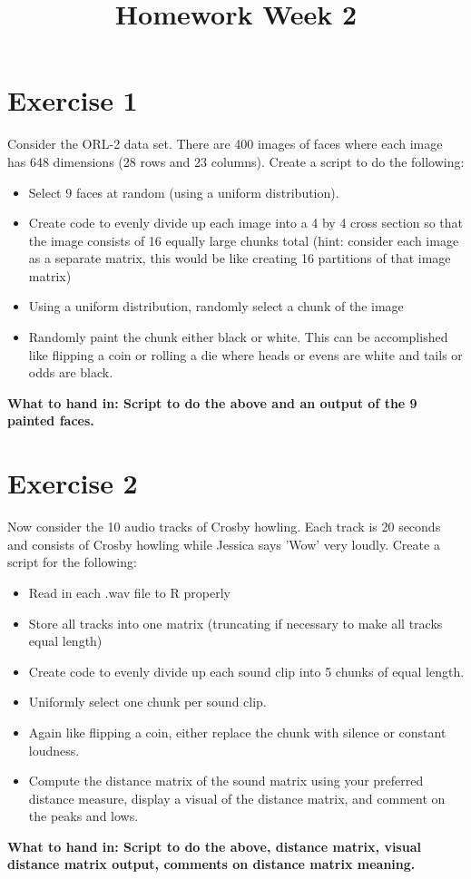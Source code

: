 \documentclass[a4paper]{article}
\begin{document}
\title{Homework Week 2}

\maketitle

\section{Exercise 1}
Consider the ORL-2 data set. There are 400 images of faces where each image has 648 dimensions (28 rows and 23 columns). Create a script to do the following:
\begin{itemize}
\item Select 9 faces at random (using a uniform distribution). 
\item Create code to evenly divide up each image into a 4 by 4 cross section so that the image consists of 16 equally large chunks total (hint: consider each image as a separate matrix, this would be like creating 16 partitions of that image matrix)
\item Using a uniform distribution, randomly select a chunk of the image
\item Randomly paint the chunk either black or white. This can be accomplished like flipping a coin or rolling a die where heads or evens are white and tails or odds are black.
\end{itemize}

\textbf{What to hand in: Script to do the above and an output of the 9 painted faces. }


\section{Exercise 2}
Now consider the 10 audio tracks of Crosby howling. Each track is 20 seconds and consists of Crosby howling while Jessica says 'Wow' very loudly. Create a script for the following:

\begin{itemize}
\item Read in each .wav file to R properly
\item Store all tracks into one matrix (truncating if necessary to make all tracks equal length)
\item Create code to evenly divide up each sound clip into 5 chunks of equal length.
\item Uniformly select one chunk per sound clip.
\item Again like flipping a coin, either replace the chunk with silence or constant loudness.
\item Compute the distance matrix of the sound matrix using your preferred distance measure, display a visual of the distance matrix, and comment on the peaks and lows.
\end{itemize}

\textbf{What to hand in: Script to do the above, distance matrix, visual distance matrix output, comments on distance matrix meaning.}
\end{document}
